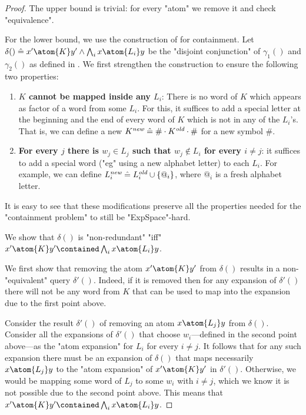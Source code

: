 \begin{proof}
	The upper bound is trivial: for every "atom" we remove it and check "equivalence".
	
	For the lower bound, we use the construction of  for containment. Let $\delta() 
	\defeq x' \atom{K} y' \land \bigwedge_i x \atom{L_i} y$ be the "disjoint conjunction" of $\gamma_1()$ and $\gamma_2()$ as defined in .
	We first strengthen the construction to ensure the following two properties:
	\begin{enumerate}
		\item \textbf{$K$ cannot be mapped inside any $L_i$}: There is no word of $K$ which appears as factor of a word from some $L_i$. For this, it suffices to add a special letter at the beginning and the end of every word of $K$ which is not in any of the $L_i$'s. That is, we can define a new $K^{\textit{new}} \mathrel{\hat{=}} \# \cdot K^{\textit{old}} \cdot \#$ for a new symbol $\#$.
		\item \textbf{For every $j$ there is $w_j \in L_j$ such that $w_j \not\in L_i$ for every $i \neq j$}: it suffices to add a special word ("eg" using a new alphabet letter) to each $L_i$. For example, we can define $L_{i}^{\textit{new}} \mathrel{\hat{=}} L_{i}^\textit{old} \cup \{@_i\}$, where $@_i$ is a fresh alphabet letter.
	\end{enumerate}
	It is easy to see that these modifications preserve all the properties needed for the "containment problem" to still be "ExpSpace"-hard.
	
	We show that $\delta()$ is "non-redundant" "iff" $x' \atom{K} y' \contained \bigwedge_i x \atom{L_i} y$.
	
	 We first show that removing the atom $x' \atom{K} y'$ from $\delta()$ results in a non-"equivalent" query $\delta'()$. Indeed, if it is removed then for any expansion of $\delta'()$ there will not be any word from $K$ that can be used to map into the expansion due to the first point above.

	 Consider the result $\delta'()$ of removing an atom $x \atom{L_j} y$ from $\delta()$. Consider all the expansions of $\delta'()$ that choose $w_i$---defined in the second point above---as the "atom expansion" for $L_i$ for every $i \neq j$. It follows that for any such expansion there must be an expansion of $\delta()$ that maps necessarily $x \atom{L_j} y$ to the "atom expansion" of $x' \atom{K} y'$ in $\delta'()$. Otherwise, we would be mapping some word of $L_j$ to some $w_i$ with $i\neq j$, which we know it is not possible due to the second point above.
	This means that $x' \atom{K} y' \contained \bigwedge_i x \atom{L_i} y$.


\end{proof}
